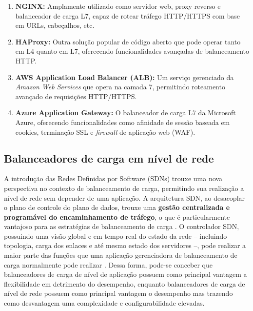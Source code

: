 \begin{enumerate}
    \item \textbf{NGINX:} Amplamente utilizado como servidor web, proxy reverso e balanceador de carga L7, capaz de rotear tráfego HTTP/HTTPS com base em URLs, cabeçalhos, etc.
    \item \textbf{HAProxy:} Outra solução popular de código aberto que pode operar tanto em L4 quanto em L7, oferecendo funcionalidades avançadas de balanceamento HTTP.
    \item \textbf{AWS Application Load Balancer (ALB):} Um serviço gerenciado da \textit{Amazon Web Services} que opera na camada 7, permitindo roteamento avançado de requisições HTTP/HTTPS.
    \item \textbf{Azure Application Gateway:} O balanceador de carga L7 da Microsoft Azure, oferecendo funcionalidades como afinidade de sessão baseada em cookies, terminação SSL e \textit{firewall} de aplicação web (WAF).
\end{enumerate}

\subsection{Balanceadores de carga em nível de rede}

A introdução das Redes Definidas por Software (SDNs) trouxe uma nova perspectiva no contexto de balanceamento de carga, permitindo sua realização a nível de rede sem depender de uma aplicação. A arquitetura SDN, ao desacoplar o plano de controle do plano de dados, trouxe uma \textbf{gestão centralizada e programável do encaminhamento de tráfego}, o que é particularmente vantajoso para as estratégias de balanceamento de carga \cite{BelgaumRiyazMusaShahrulnizaAlamMansoorSuudMohd2020}. O controlador SDN, possuindo uma visão global e em tempo real do estado da rede – incluindo topologia, carga dos enlaces e até mesmo estado dos servidores –, pode realizar a maior parte das funções que uma aplicação gerenciadora de balanceamento de carga normalmente pode realizar \cite{hamdan2021}. Dessa forma, pode-se conceber que balanceadores de carga de nível de aplicação possuem como principal vantagem a flexibilidade em detrimento do desempenho, enquanto balanceadores de carga de nível de rede possuem como principal vantagem o desempenho mas trazendo como desvantagem uma complexidade e configurabilidade elevadas.

